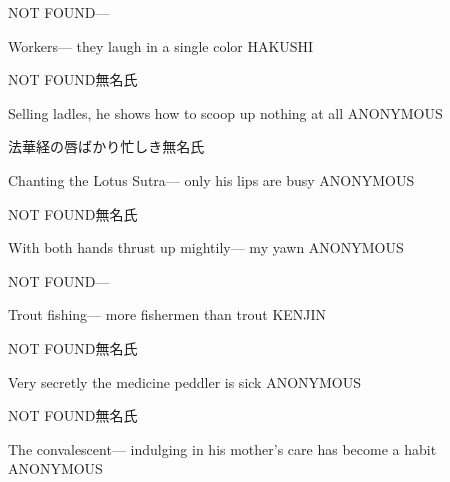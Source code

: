 \begin{haiku}
   NOT FOUND\hfill{---}

    \vin{} Workers---
    \vin{} \vin{} they laugh
    \vin{} \vin{} \vin{} in a single color \hspace{\fill} HAKUSHI
\end{haiku}

\begin{haiku}
    NOT FOUND\hfill{\FH 無名氏}

    \vin{} Selling ladles,
    \vin{} \vin{} he shows how to scoop up
    \vin{} \vin{} \vin{} nothing at all \hspace{\fill} ANONYMOUS
\end{haiku}

\begin{haiku}
    {法華経の唇ばかり忙しき}\hfill{\FH 無名氏}

    \vin{} Chanting the Lotus Sutra---
    \vin{} \vin{} only his lips
    \vin{} \vin{} \vin{} are busy \hspace{\fill} ANONYMOUS
\end{haiku}

\begin{haiku}
    NOT FOUND\hfill{\FH 無名氏}

    \vin{} With both hands
    \vin{} \vin{} thrust up mightily---
    \vin{} \vin{} \vin{} my yawn \hspace{\fill} ANONYMOUS
\end{haiku}

\begin{haiku}
   NOT FOUND\hfill{---}

    \vin{} Trout fishing---
    \vin{} \vin{} more fishermen
    \vin{} \vin{} \vin{} than trout \hspace{\fill} KENJIN
\end{haiku}

\begin{haiku}
    NOT FOUND\hfill{\FH 無名氏}

    \vin{} Very secretly
    \vin{} \vin{} the medicine peddler
    \vin{} \vin{} \vin{} is sick \hspace{\fill} ANONYMOUS
\end{haiku}

\begin{haiku}
    NOT FOUND\hfill{\FH 無名氏}

    \vin{} The convalescent---
    \vin{} \vin{} indulging in his mother's care
    \vin{} \vin{} \vin{} has become a habit \hspace{\fill} ANONYMOUS
\end{haiku}


